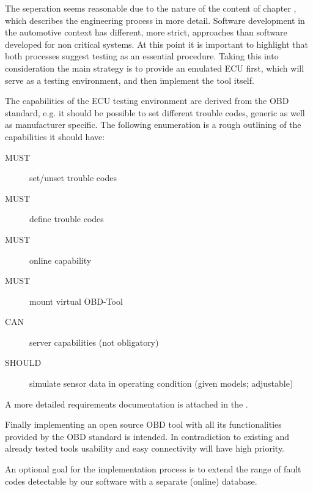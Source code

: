 
The seperation seems reasonable due to the nature of the content of chapter  
, which describes the engineering process in more detail. Software development in the automotive context has different, more
strict, approaches than software developed for non critical systems.
At this point it is important to highlight that both processes suggest
testing as an essential procedure. Taking this into
consideration the main strategy is to provide an emulated ECU first,
which will serve as a testing environment, and then implement the tool
itself.

The capabilities of the ECU testing environment are derived from the
OBD standard, e.g. it should be possible to set different trouble codes,
generic as well as manufacturer specific. The following enumeration is
a rough outlining of the capabilities it should have:

\begin{description}
\item[MUST]   set/unset trouble codes
\item[MUST]   define trouble codes
\item[MUST]   online capability
\item[MUST]   mount virtual OBD-Tool
\item[CAN]    server capabilities (not obligatory)
\item[SHOULD] simulate sensor data in operating condition (given models;
  adjustable)
\end{description}

A more detailed requirements documentation is attached in the .

Finally implementing an open source OBD tool with all its
functionalities provided by the OBD standard is
intended. In contradiction to existing and already tested tools usability and easy
connectivity will have high priority.

An optional goal for the implementation process is to extend the range
of fault codes detectable by our software with a separate (online)
database.

